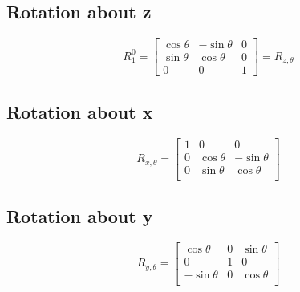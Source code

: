 \subsection{Rotation about z}

\begin{equation}
	R_1^0 =
	\begin{bmatrix}
		\cos \theta & -\sin \theta & 0\\
		\sin \theta & \cos \theta & 0\\
		0 & 0 & 1
	\end{bmatrix} = R_{z,\theta}
\end{equation}
\subsection{Rotation about x}

\begin{equation}
	R_{x,\theta} =
	\begin{bmatrix}
		1 & 0 & 0 \\
		0 & \cos \theta & -\sin \theta\\
		0 & \sin \theta & \cos \theta\\
	\end{bmatrix}
\end{equation}
\subsection{Rotation about y}

\begin{equation}
	R_{y,\theta} =
	\begin{bmatrix}
		\cos \theta & 0 & \sin \theta \\
		0 & 1 & 0\\
		-\sin \theta & 0 & \cos \theta\\
	\end{bmatrix}
\end{equation}